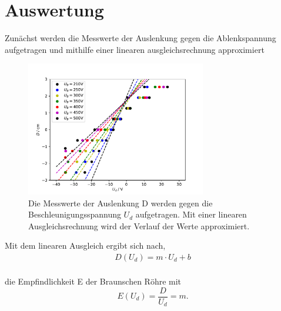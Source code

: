 \section{Auswertung}
\label{sec:Auswertung}
Zunächst werden die Messwerte der Auslenkung gegen die Ablenkspannung aufgetragen und mithilfe einer linearen ausgleichsrechnung approximiert
 \begin{figure}
     \centering
     \includegraphics[width = 0.7\textwidth]{plots/all.pdf}
     \caption{Die Messwerte der Auslenkung D werden gegen die Beschleunigungsspannung $U_d$ aufgetragen.
              Mit einer linearen Ausgleichsrechnung wird der Verlauf der Werte approximiert.}
 \end{figure}
Mit dem linearen Ausgleich ergibt sich nach,
\begin{align}
    D(U_d) = m\cdot U_d + b  \nonumber \\
\end{align}

die Empfindlichkeit E der Braunschen Röhre mit
\begin{equation}
    E(U_d)=\frac{D}{U_d}=m.
\end{equation}


